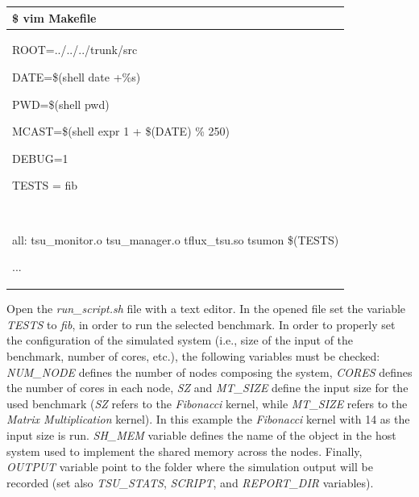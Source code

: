 \documentclass[a4paper]{article}
\begin{document}
\begin{flushleft}
\tablehead{}
\begin{supertabular}{|m{6.34626in}|}
\hline
{}\ttfamily \$ vim Makefile\\\hline
{\ttfamily ROOT=../../../trunk/src}

{\ttfamily DATE=\$(shell date +\%s)}

{\ttfamily PWD=\$(shell pwd)}

{\ttfamily MCAST=\$(shell expr 1 + \$(DATE) \%
250)}

{\ttfamily DEBUG=1}

{\ttfamily TESTS = fib}

~

{\ttfamily all: tsu\_monitor.o tsu\_manager.o
tflux\_tsu.so tsumon \$(TESTS)}

\ttfamily ...\\\hline
\end{supertabular}
\end{flushleft}
{
Open the \textit{run\_script.sh} file with a text editor. In the opened
file set the variable \textit{TESTS} to \textit{fib}, in order to run
the selected benchmark. In order to properly set the configuration of
the simulated system (i.e., size of the input of the benchmark, number
of cores, etc.), the following variables must be checked:
\textit{NUM\_NODE} defines the number of nodes composing the system,
\textit{CORES} defines the number of cores in each node, \textit{SZ}
and \textit{MT\_SIZE} define the input size for the used benchmark
(\textit{SZ} refers to the \textit{Fibonacci} kernel, while
\textit{MT\_SIZE} refers to the \textit{Matrix Multiplication} kernel).
In this example the \textit{Fibonacci} kernel with 14 as the input size
is run. \textit{SH\_MEM} variable defines the name of the object in the
host system used to implement the shared memory across the nodes.
Finally, \textit{OUTPUT} variable point to the folder where the
simulation output will be recorded (set also \textit{TSU\_STATS},
\textit{SCRIPT}, and \textit{REPORT\_DIR} variables).}
\end{document}
